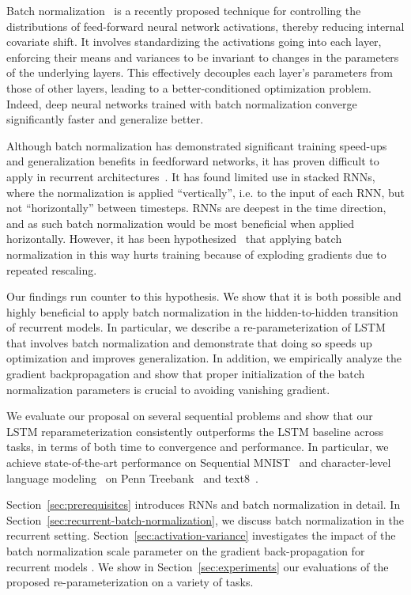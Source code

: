 \documentclass{article} %
\begin{document}
Batch normalization~\cite{batchnorm} is a recently proposed technique for controlling the distributions of feed-forward neural network activations, thereby reducing internal covariate shift.
It involves standardizing the activations going into each layer, enforcing their means and variances to be invariant to changes in the parameters of the underlying layers.
This effectively decouples each layer's parameters from those of other layers, leading to a better-conditioned optimization problem.
Indeed, deep neural networks trained with batch normalization converge significantly faster and generalize better.

Although batch normalization has demonstrated significant training speed-ups and generalization benefits in feedforward networks,
it has proven difficult to apply in recurrent architectures~\cite{cesar,baidu}.
It has found limited use in stacked RNNs, where the normalization is applied ``vertically'', i.e. to the input of each RNN, but not ``horizontally'' between timesteps.
RNNs are deepest in the time direction, and as such batch normalization would be most beneficial when applied horizontally.
However, it has been hypothesized~\cite{cesar} that applying batch normalization in this way hurts training
because of exploding gradients due to repeated rescaling.

Our findings run counter to this hypothesis.
We show that it is both possible and highly beneficial to apply batch normalization in the hidden-to-hidden transition of recurrent models.
In particular, we describe a re-parameterization of LSTM that involves batch normalization
and demonstrate that doing so speeds up optimization and improves generalization.
In addition, we empirically analyze the gradient backpropagation and show that proper initialization
of the batch normalization parameters is crucial to avoiding vanishing gradient.

We evaluate our proposal on several sequential problems and show that our
LSTM reparameterization consistently outperforms the LSTM baseline across tasks,
in terms of both time to convergence and performance.
In particular, we achieve state-of-the-art performance on
Sequential MNIST~\cite{le2015simple} and
character-level language modeling~\cite{mikolov2012subword} on Penn Treebank~\cite{penntreebank} and text8~\cite{mahoney2009large}.

Section~\ref{sec:prerequisites} introduces RNNs and batch normalization in detail.
In Section~\ref{sec:recurrent-batch-normalization}, we discuss batch normalization in the recurrent setting.
Section~\ref{sec:activation-variance} investigates the impact of the batch normalization scale parameter on the gradient back-propagation for
recurrent models .
We show in Section~\ref{sec:experiments} our evaluations of the proposed re-parameterization on a variety of tasks.
\end{document}
